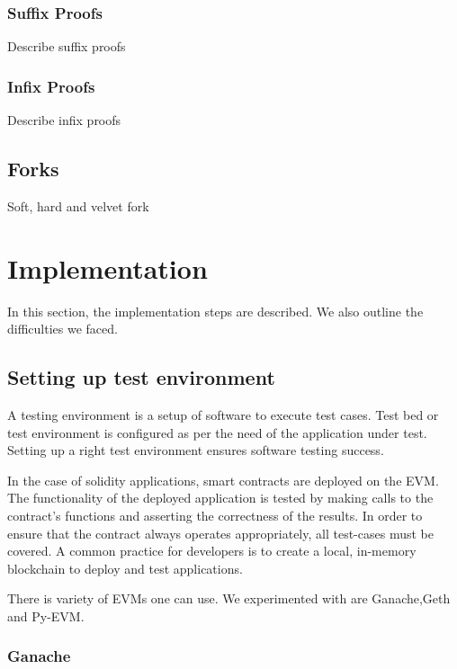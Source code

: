 \documentclass{article}
\begin{document}
  \subsubsection{Suffix Proofs}

  Describe suffix proofs

  \subsubsection{Infix Proofs}

  Describe infix proofs

  \subsection{Forks}

  Soft, hard and velvet fork

  \section{Implementation}

  In this section, the implementation steps are described. We also
  outline the difficulties we faced.

  \subsection{Setting up test environment}

  A testing environment is a setup of software to execute test cases.
  Test bed or test environment is configured as per the need of the
  application under test. Setting up a right test environment ensures
  software testing success.

  In the case of solidity applications, smart contracts are deployed on
  the EVM. The functionality of the deployed application is tested by
  making calls to the contract's functions and asserting the correctness
  of the results. In order to ensure that the contract always operates
  appropriately, all test-cases must be covered. A common practice for
  developers is to create a local, in-memory blockchain to deploy and
  test applications.

  There is variety of EVMs one can use. We experimented with are
  Ganache,Geth and Py-EVM.

  \subsubsection{Ganache}
\end{document}
